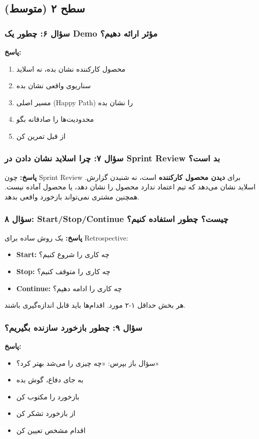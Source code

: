 \documentclass[12pt, a4paper]{article}
\begin{document}
\subsection{سطح ۲ (متوسط)}

\subsubsection{سؤال ۶: چطور یک Demo مؤثر ارائه دهیم؟}
\textbf{پاسخ:}
\begin{enumerate}
    \item محصول کارکننده نشان بده، نه اسلاید
    \item سناریوی واقعی نشان بده
    \item مسیر اصلی (Happy Path) را نشان بده
    \item محدودیت‌ها را صادقانه بگو
    \item از قبل تمرین کن
\end{enumerate}

\subsubsection{سؤال ۷: چرا اسلاید نشان دادن در Sprint Review بد است؟}
\textbf{پاسخ:} چون Sprint Review برای \textbf{دیدن محصول کارکننده} است، نه 
شنیدن گزارش. اسلاید نشان می‌دهد که تیم اعتماد ندارد محصول را نشان دهد، یا 
محصول آماده نیست. همچنین مشتری نمی‌تواند بازخورد واقعی بدهد.

\subsubsection{سؤال ۸: Start/Stop/Continue چیست؟ چطور استفاده کنیم؟}
\textbf{پاسخ:} یک روش ساده برای Retrospective:
\begin{itemize}
    \item \textbf{Start:} چه کاری را شروع کنیم؟
    \item \textbf{Stop:} چه کاری را متوقف کنیم؟
    \item \textbf{Continue:} چه کاری را ادامه دهیم؟
\end{itemize}
هر بخش حداقل ۱-۲ مورد. اقدام‌ها باید قابل اندازه‌گیری باشند.

\subsubsection{سؤال ۹: چطور بازخورد سازنده بگیریم؟}
\textbf{پاسخ:}
\begin{itemize}
    \item سؤال باز بپرس: «چه چیزی را می‌شد بهتر کرد؟»
    \item به جای دفاع، گوش بده
    \item بازخورد را مکتوب کن
    \item از بازخورد تشکر کن
    \item اقدام مشخص تعیین کن
\end{itemize}
\end{document}
